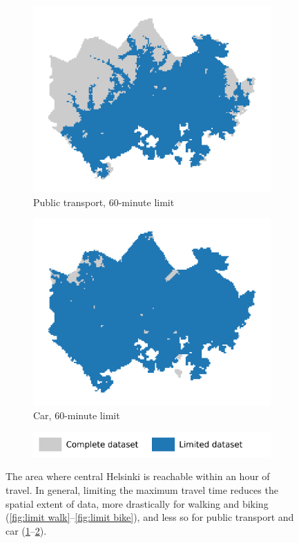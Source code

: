 \begin{figure}[H]
\begin{subfigure}[b]{0.5\textwidth}
		\includegraphics[width=\textwidth]{visual/figures/ttm/tt_limit_pt}
		\caption{Public transport, 60-minute limit}
		\label{fig:limit pt}
	\end{subfigure}%
	\hfill
	\begin{subfigure}[b]{0.5\textwidth}
		\includegraphics[width=\textwidth]{visual/figures/ttm/tt_limit_car}
		\caption{Car, 60-minute limit}
		\label{fig:limit car}
	\end{subfigure}%
	\hfill
	\begin{subfigure}[b]{0.55\textwidth}
		\includegraphics[width=\textwidth]{visual/figures/ttm/tt_limit_legend}
	\end{subfigure}%
	\caption{
		The area where central Helsinki is reachable within an hour of travel.
		In general, limiting the maximum travel time reduces the spatial extent of data,
		more drastically for walking and biking (\ref{fig:limit walk}--\ref{fig:limit bike}),
		and less so for public transport and car (\ref{fig:limit pt}--\ref{fig:limit car}).
	}
	\label{fig:tt limits}
\end{figure}

